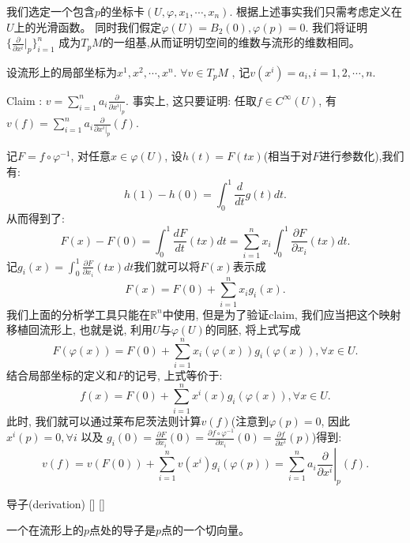 \documentclass[UTF8]{ctexart}
\begin{document}
    \begin{prf}
        
        
        
        

    我们选定一个包含$p$的坐标卡$(U, \varphi , x_1, \cdots , x_n)$.
    根据上述事实我们只需考虑定义在$U$上的光滑函数。
    同时我们假定$\varphi (U) = B_2(0),\varphi (p) = 0$.
    我们将证明$ \{ \frac{\partial}{\partial x^i} |_p \}_{i=1}^n $
    成为$T_p M$的一组基,从而证明切空间的维数与流形的维数相同。
    
    设流形上的局部坐标为$x^1, x^2 , \cdots , x^n$. $\forall v \in T_p M$ , 记$v(x^i) = a_i , i=1,2,\cdots, n$.
    
    Claim : $v = \sum_{i=1}^n a_i \frac{\partial}{\partial x^i |_p}$. 事实上, 这只要证明: 任取$f \in C^{\infty} (U)$, 有$v(f) = \sum_{i=1}^n a_i \frac{\partial}{\partial x^i |_p} (f)$.
    
    记$F = f \circ \varphi^{−1}$, 对任意$ x \in \varphi (U) $, 设$h(t) = F(tx)$(相当于对$F$进行参数化),我们有:
    \[
        h(1) - h(0) = \int_0^{1} \frac{d}{dt} g(t) d t.
    \]
    从而得到了:
    \[
    F(x)-F(0)=\int_{0}^{1} \frac{d F}{d t}(t x) d t=\sum_{i=1}^{n} x_{i} \int_{0}^{1} \frac{\partial F}{\partial x_{i}}(t x) d t .
    \]
    记$g_i(x) = \int_{0}^{1} \frac{\partial F}{\partial x_{i}}(t x) d t $我们就可以将$F(x)$表示成
    \[
        F(x) = F(0) + \displaystyle\sum_{i = 1}^n x_i g_i(x).
    \]
    我们上面的分析学工具只能在$\mathbb{R}^n$中使用, 但是为了验证claim, 我们应当把这个映射移植回流形上, 也就是说, 利用$U$与$\varphi(U)$的同胚, 将上式写成
    \[
        F(\varphi(x)) = F(0) + \displaystyle\sum_{i = 1}^n x_i(\varphi(x)) g_i(\varphi(x)), \forall x \in U.
    \]
    结合局部坐标的定义和$F$的记号, 上式等价于:
    \[
        f(x) = F(0) + \displaystyle\sum_{i = 1}^n x^i(x) g_i(\varphi(x)), \forall x \in U.
    \]
    此时, 我们就可以通过莱布尼茨法则计算$v(f)$(注意到$\varphi(p) = 0$, 因此$x^i (p) = 0 , \forall i $ 以及 $g_i(0) = \frac{\partial F}{\partial x_{i}}(0) = \frac{\partial f \circ \varphi^{-1}}{\partial x_{i}}(0) =  \frac{\partial f }{\partial x^{i}}(p)$)得到:
    \[
    v(f) = v(F(0)) + \displaystyle\sum_{i=1}^{n} v\left(x^{i}\right) g_{i}(\varphi(p)) =
    \left.\sum_{i=1}^{n} a_{i} \frac{\partial}{\partial x^{i}}\right|_{p}(f).
    \]
    \end{prf}
    
    \begin{dfn}
        []
        {导子(derivation)}
        []
        []

        一个在流形上的$p$点处的导子是$p$点的一个切向量。
    \end{dfn}
    
\end{document}
